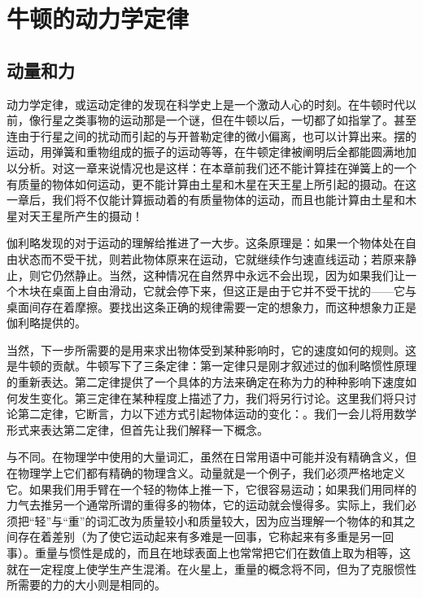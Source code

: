 \chapter{牛顿的动力学定律}

\section{动量和力}

动力学定律，或运动定律的发现在科学史上是一个激动人心的时刻。在牛顿时代以前，像行星之类事物的运动那是一个谜，但在牛顿以后，一切都了如指掌了。甚至连由于行星之间的扰动而引起的与开普勒定律的微小偏离，也可以计算出来。摆的运动，用弹簧和重物组成的振子的运动等等，在牛顿定律被阐明后全都能圆满地加以分析。对这一章来说情况也是这样：在本章前我们还不能计算挂在弹簧上的一个有质量的物体如何运动，更不能计算由土星和木星在天王星上所引起的摄动。在这一章后，我们将不仅能计算振动着的有质量物体的运动，而且也能计算由土星和木星对天王星所产生的摄动！

伽利略发现的对于运动的理解给推进了一大步。这条原理是：如果一个物体处在自由状态而不受干扰，则若此物体原来在运动，它就继续作匀速直线运动；若原来静止，则它仍然静止。当然，这种情况在自然界中永远不会出现，因为如果我们让一个木块在桌面上自由滑动，它就会停下来，但这正是由于它并不受干扰的——它与桌面间存在着摩擦。要找出这条正确的规律需要一定的想象力，而这种想象力正是伽利略提供的。

当然，下一步所需要的是用来求出物体受到某种影响时，它的速度如何的规则。这是牛顿的贡献。牛顿写下了三条定律：第一定律只是刚才叙述过的伽利略惯性原理的重新表达。第二定律提供了一个具体的方法来确定在称为力的种种影响下速度如何发生变化。第三定律在某种程度上描述了力，我们将另行讨论。这里我们将只讨论第二定律，它断言，力以下述方式引起物体运动的变化：。我们一会儿将用数学形式来表达第二定律，但首先让我们解释一下概念。

与不同。在物理学中使用的大量词汇，虽然在日常用语中可能并没有精确含义，但在物理学上它们都有精确的物理含义。动量就是一个例子，我们必须严格地定义它。如果我们用手臂在一个轻的物体上推一下，它很容易运动；如果我们用同样的力气去推另一个通常所谓的重得多的物体，它的运动就会慢得多。实际上，我们必须把“轻”与“重”的词汇改为质量较小和质量较大，因为应当理解一个物体的和其之间存在着差别（为了使它运动起来有多难是一回事，它称起来有多重是另一回事）。重量与惯性是成的，而且在地球表面上也常常把它们在数值上取为相等，这就在一定程度上使学生产生混淆。在火星上，重量的概念将不同，但为了克服惯性所需要的力的大小则是相同的。

